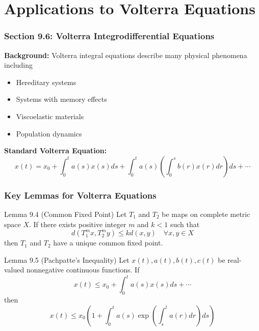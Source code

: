 \documentclass[aspectratio=169,10pt]{beamer}
\begin{document}
\section{Applications to Volterra Equations}

\begin{frame}
    \frametitle{Section 9.6: Volterra Integrodifferential Equations}

    \textbf{Background:} Volterra integral equations describe many physical phenomena including
    \begin{itemize}
        \item Hereditary systems
        \item Systems with memory effects
        \item Viscoelastic materials
        \item Population dynamics
    \end{itemize}

    \bigskip

    \textbf{Standard Volterra Equation:}
    \[
    x(t) = x_0 + \int_0^t a(s)x(s)ds + \int_0^t a(s)\left(\int_0^s b(r)x(r)dr\right) ds + \cdots
    \]
\end{frame}

\begin{frame}
    \frametitle{Key Lemmas for Volterra Equations}

    \begin{block}{Lemma 9.4 (Common Fixed Point)}
        Let $T_1$ and $T_2$ be maps on complete metric space $X$. If there exists positive integer $m$ and $k < 1$ such that
        \[
        d(T_1^m x, T_2^m y) \leq kd(x,y) \quad \forall x,y \in X
        \]
        then $T_1$ and $T_2$ have a unique common fixed point.
    \end{block}

    \bigskip

    \begin{block}{Lemma 9.5 (Pachpatte's Inequality)}
        Let $x(t), a(t), b(t), c(t)$ be real-valued nonnegative continuous functions. If
        \[
        x(t) \leq x_0 + \int_0^t a(s)x(s)ds + \cdots
        \]
        then
        \[
        x(t) \leq x_0\left(1 + \int_0^t a(s)\exp\left(\int_s^t a(r)dr\right)ds\right)
        \]
    \end{block}
\end{frame}
\end{document}
